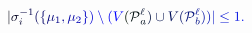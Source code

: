 \documentclass[12pt]{article}
\begin{document}
\makeatletter
\renewcommand*{\@textcolor}[3]{%
  \protect\leavevmode
  \begingroup
    \color#1{#2}#3%
  \endgroup
}
\makeatother
\begin{displaymath}
\mathcolor[RGB]{0,0,15}{|} \mathcolor[RGB]{0,0,30}{\sigma} _ { \mathcolor[RGB]{0,0,45}{i} } ^ { \mathcolor[RGB]{0,0,60}{-} \mathcolor[RGB]{0,0,75}{1} } \mathcolor[RGB]{0,0,90}{(} \mathcolor[RGB]{0,0,105}{\{} \mathcolor[RGB]{0,0,120}{\mu} _ { \mathcolor[RGB]{0,0,135}{1} } \mathcolor[RGB]{0,0,150}{,} \mathcolor[RGB]{0,0,165}{\mu} _ { \mathcolor[RGB]{0,0,180}{2} } \mathcolor[RGB]{0,0,195}{\}} \mathcolor[RGB]{0,0,210}{)} \mathcolor[RGB]{0,0,225}{\setminus} \mathcolor[RGB]{0,0,240}{(} \mathcolor[RGB]{0,0,255}{V} \mathcolor[RGB]{0,15,0}{(} \mathcal { \mathcolor[RGB]{0,15,15}{P} } _ { \mathcolor[RGB]{0,15,30}{a} } ^ { \mathcolor[RGB]{0,15,45}{\ell} } \mathcolor[RGB]{0,15,60}{)} \mathcolor[RGB]{0,15,75}{\cup} \mathcolor[RGB]{0,15,90}{V} \mathcolor[RGB]{0,15,105}{(} \mathcal { \mathcolor[RGB]{0,15,120}{P} } _ { \mathcolor[RGB]{0,15,135}{b} } ^ { \mathcolor[RGB]{0,15,150}{\ell} } \mathcolor[RGB]{0,15,165}{)} \mathcolor[RGB]{0,15,180}{)} \mathcolor[RGB]{0,15,195}{|} \mathcolor[RGB]{0,15,210}{\leq} \mathcolor[RGB]{0,15,225}{1} \mathcolor[RGB]{0,15,240}{.}
\end{displaymath}
\end{document}
